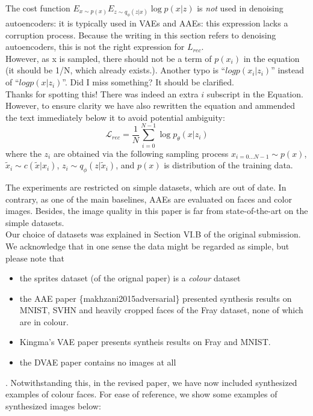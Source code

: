 \documentclass{article}
\begin{document}
The cost function $E_{x\sim p(x)} E_{z\sim q_\phi(z|x)} \log p(x | z)$ is {\em not} used in denoising autoencoders: it is typically used in VAEs and AAEs: this expression lacks a corruption process. Because the writing in this section refers to denoising autoencoders, this is not the right expression for $L_{rec}$.\\

{\color{blue} However, as x is sampled, there should not be a term of $p(x_i)$ in the equation (it should be 1/N, which already exists.). Another typo is “$log p(x_i | z_i)$” instead of “$log p(x | z_i)$”. Did I miss something? It should be clarified.}\\

Thanks for spotting this!  There was indeed an extra $i$ subscript in the Equation. However, to ensure clarity we have also rewritten the equation and ammended the text immediately below it to avoid potential ambiguity:
\[ \mathcal{L}_{rec} = \frac{1}{N}\sum_{i=0}^{N-1} \log p_\theta(x|z_i)\]
where the $z_i$ are obtained via the following sampling process $x_{i=0...N-1} \sim p(x)$, $\tilde{x}_i \sim c(\tilde{x}|x_i)$, $z_i \sim q_\phi(z|\tilde{x}_i)$, and $p(x)$ is distribution of the training data.


{\color{blue}
The experiments are restricted on simple datasets, which are out of date. In contrary, as one of the main baselines, AAEs are evaluated on faces and color images. Besides, the image quality in this paper is far from state-of-the-art on the simple datasets.}\\

Our choice of datasets was explained in Section VI.B of the original submission.  We acknowledge that in one sense the data might be regarded as simple, but please note that 
\begin{itemize}
    \item the sprites dataset (of the orignal paper) is a {\em colour} dataset
    \item the AAE paper \{makhzani2015adversarial\} presented {\color{red} synthesis} results on MNIST, SVHN and heavily cropped faces of the Fray dataset, none of which are in colour.
    \item Kingma's VAE paper presents {\color{red}syntheis} results on Fray and MNIST.
    \item the DVAE paper contains no images at all
\end{itemize}. 
Notwithstanding this, in the revised paper, we have now included synthesized examples of colour faces. For ease of reference, we show some examples of synthesized images below:\\
\end{document}
